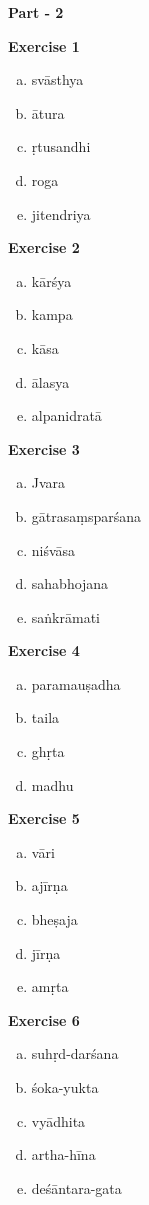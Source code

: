\begin{center}
\textbf{\LARGE Part - 2}
\end{center}
\begin{multicols}{2}
\textbf{Exercise 1}
\begin{enumerate}[a.]
\item svāsthya 
\item ātura 
\item ṛtusandhi 
\item roga 
\item jitendriya
\end{enumerate}

\textbf{Exercise 2}
\begin{enumerate}[a.]
\item kārśya 
\item kampa
\item kāsa
\item ālasya
\item alpanidratā
\end{enumerate}

\textbf{Exercise 3}
\begin{enumerate}[a.]
\item Jvara
\item gātrasaṃsparśana 
\item niśvāsa
\item sahabhojana 
\item saṅkrāmati
\end{enumerate}
\vspace{.3cm}

\textbf{Exercise 4}
\begin{enumerate}[a.]
\item paramauṣadha 
\item taila
\item ghṛta 
\item madhu 
\end{enumerate}

\textbf{Exercise 5}
\begin{enumerate}[a.]
\item vāri 
\item ajīrṇa 
\item bheṣaja 
\item jīrṇa 
\item amṛta
\end{enumerate}

\textbf{Exercise 6}
\begin{enumerate}[a.]
\item suhṛd-darśana 
\item śoka-yukta 
\item vyādhita 
\item artha-hīna 
\item deśāntara-gata
\end{enumerate}


\end{multicols}
